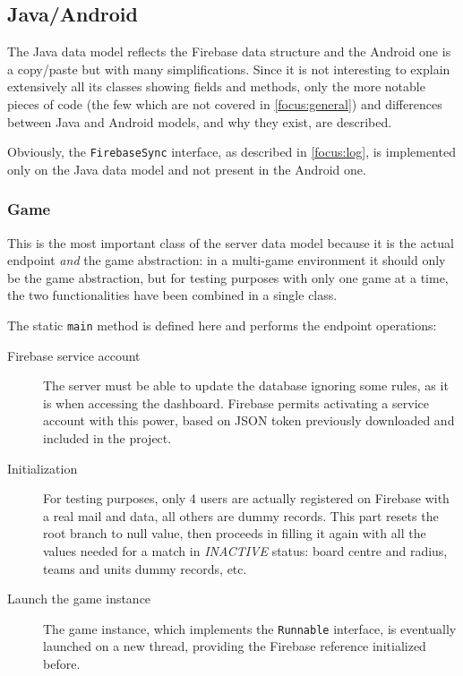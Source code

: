 		\subsection{Java/Android}
			
			The Java data model reflects the Firebase data structure and the Android one is a copy/paste but with many simplifications. Since it is not interesting to explain extensively all its classes showing fields and methods, only the more notable pieces of code (the few which are not covered in \autoref{focus:general}) and differences between Java and Android models, and why they exist, are described.
			
			Obviously, the \lstinline|FirebaseSync| interface, as described in \autoref{focus:log}, is implemented only on the Java data model and not present in the Android one.
			
			\subsubsection{Game}
		
				This is the most important class of the server data model because it is the actual endpoint \emph{and} the game abstraction: in a multi-game environment it should only be the game abstraction, but for testing purposes with only one game at a time, the two functionalities have been combined in a single class.
				
				The static \lstinline|main| method is defined here and performs the endpoint operations:
				\begin{description}
					\item[Firebase service account] The server must be able to update the database ignoring some rules, as it is when accessing the dashboard. Firebase permits activating a service account with this power, based on JSON token previously downloaded and included in the project.
					\item[Initialization] For testing purposes, only 4 users are actually registered on Firebase with a real mail and data, all others are dummy records. This part resets the root branch to null value, then proceeds in filling it again with all the values needed for a match in \emph{INACTIVE} status: board centre and radius, teams and units dummy records, etc.
					\item[Launch the game instance] The game instance, which implements the \lstinline|Runnable| interface, is eventually launched on a new thread, providing the Firebase reference initialized before.
				\end{description}
				
